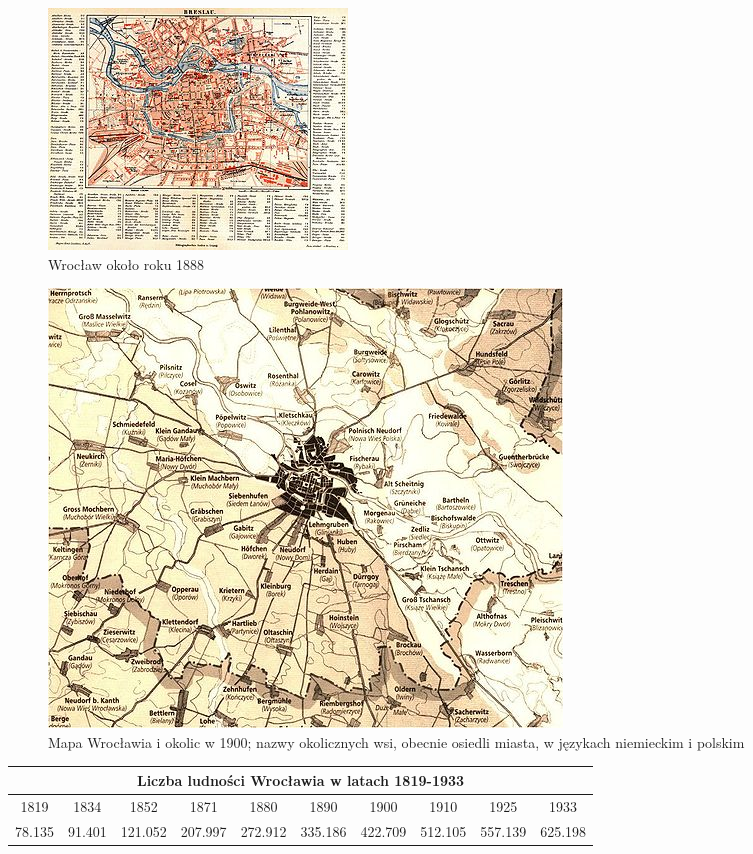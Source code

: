 \documentclass{article}
\begin{document}
\begin{figure}[h]
\centering
\includegraphics[scale=2.5]{9.jpg}
\caption{Wrocław około roku 1888}
\end{figure}
\begin{figure}[h]
\centering
\includegraphics[scale=0.3]{10.jpg}
\caption{Mapa Wrocławia i okolic w 1900;
nazwy okolicznych wsi, obecnie osiedli miasta, w językach niemieckim i polskim}
\end{figure}
\begin{center}
\begin{table}[]
\begin{tabular}{|c|c|c|c|c|c|c|c|c|c|}
\hline
\multicolumn{10}{|c|}{Liczba ludności Wrocławia w latach 1819-1933} \\ \hline
1819    &   1834    &   1852    & 1871  & 1880  & 1890  & 1900  &   1910    &   1925    &   1933    \\ \hline
78.135 & 91.401 & 121.052 & 207.997 & 272.912 & 335.186 & 422.709 & 512.105 & 557.139 & 625.198 \\ \hline
\end{tabular}
\end{table}
\end{center}
\end{document}
